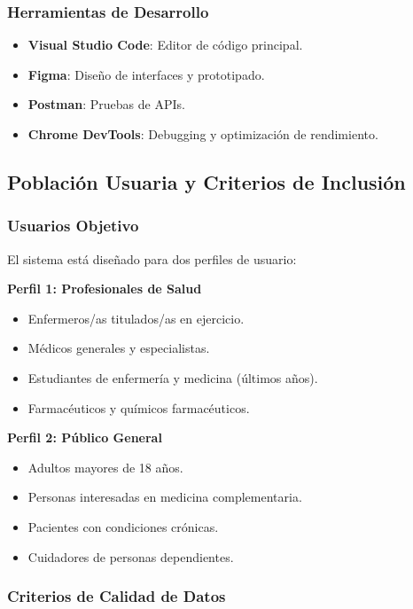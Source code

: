 \documentclass[12pt,a4paper]{article}
\begin{document}
\subsubsection{Herramientas de Desarrollo}

\begin{itemize}
    \item \textbf{Visual Studio Code}: Editor de código principal.
    \item \textbf{Figma}: Diseño de interfaces y prototipado.
    \item \textbf{Postman}: Pruebas de APIs.
    \item \textbf{Chrome DevTools}: Debugging y optimización de rendimiento.
\end{itemize}

\subsection{Población Usuaria y Criterios de Inclusión}

\subsubsection{Usuarios Objetivo}

El sistema está diseñado para dos perfiles de usuario:

\textbf{Perfil 1: Profesionales de Salud}
\begin{itemize}
    \item Enfermeros/as titulados/as en ejercicio.
    \item Médicos generales y especialistas.
    \item Estudiantes de enfermería y medicina (últimos años).
    \item Farmacéuticos y químicos farmacéuticos.
\end{itemize}

\textbf{Perfil 2: Público General}
\begin{itemize}
    \item Adultos mayores de 18 años.
    \item Personas interesadas en medicina complementaria.
    \item Pacientes con condiciones crónicas.
    \item Cuidadores de personas dependientes.
\end{itemize}

\subsubsection{Criterios de Calidad de Datos}
\end{document}
